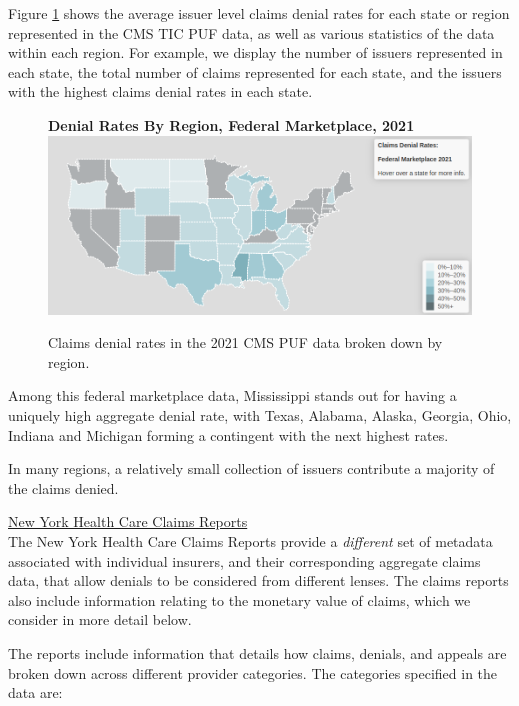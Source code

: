 \documentclass[12pt, a4paper,twoside]{report}
\theoremstyle{plain} %
\theoremstyle{definition} %
\theoremstyle{remark} %
\numberwithin{equation}{chapter}
\begin{document}
		
		\clearpage
		
		Figure \ref{federalbyregion} shows the average issuer level claims denial rates for each state or region represented in the CMS TIC PUF data, as well as various statistics of the data within each region. For example, we display the number of issuers represented in each state, the total number of claims represented for each state, and the issuers with the highest claims denial rates in each state.
					
					
		\begin{figure}[h!]
			\centering
			\textbf{Denial Rates By Region, Federal Marketplace, 2021}
			\includegraphics[width=\columnwidth]{images/cms_puf/federal_denial_rates.png}
			\caption{Claims denial rates in the 2021 CMS PUF data broken down by region.}
			\label{federalbyregion}
		\end{figure}
	
		Among this federal marketplace data, Mississippi stands out for having a uniquely high aggregate denial rate, with Texas, Alabama, Alaska, Georgia, Ohio, Indiana and Michigan forming a contingent with the next highest rates.
		
		In many regions, a relatively small collection of issuers contribute a majority of the claims denied.
		
		\underline{New York Health Care Claims Reports}\\
		
		The New York Health Care Claims Reports provide a \emph{different} set of metadata associated with individual insurers, and their corresponding aggregate claims data, that allow denials to be considered from different lenses. The claims reports also include information relating to the monetary value of claims, which we consider in more detail below.
		
		The reports include information that details how claims, denials, and appeals are broken down across different provider categories. The categories specified in the data are:
		
\end{document}
